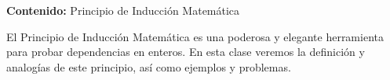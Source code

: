 {\Large\textbf{Contenido:} Principio de Inducción Matemática}

El Principio de Inducción Matemática es una poderosa y elegante herramienta para probar dependencias en enteros.
En esta clase veremos la definición y analogías de este principio, así como ejemplos y problemas.